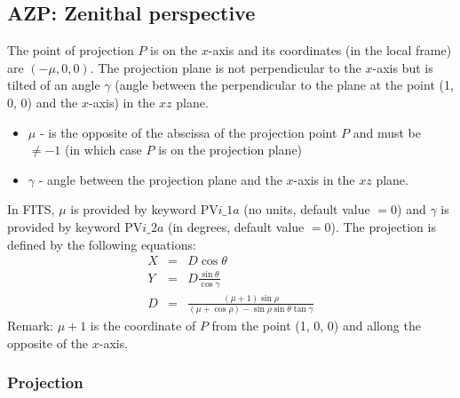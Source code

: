 \subsection{AZP: Zenithal perspective \label{sec:azp}}

  The point of projection $P$ is on the $x$-axis and its coordinates (in the local frame) are $(-\mu, 0, 0)$.
  The projection plane is not perpendicular to the $x$-axis but is tilted of an angle $\gamma$
  (angle between the perpendicular to the plane at the point (1, 0, 0) and the $x$-axis) in the $xz$ plane.
  \begin{itemize}
    \item $\mu$ - is the opposite of the abscissa of the projection point $P$ and must be $\ne -1$
          (in which case $P$ is on the projection plane)
    \item $\gamma$ - angle between the projection plane and the $x$-axis in the $xz$ plane.
  \end{itemize}
  In FITS, $\mu$ is provided by keyword PV$i\_1a$ (no units, default value $=0$) and
  $\gamma$ is provided by keyword PV$i\_2a$ (in degrees, default value $=0$).
  The projection is defined by the following equations:
  \begin{eqnarray}
    X & = & D \cos\theta \\
    Y & = & D \frac{\sin\theta}{\cos\gamma} \\
    D & = & \frac{(\mu + 1) \sin\rho}{(\mu + \cos\rho) - \sin\rho\sin\theta\tan\gamma}
  \end{eqnarray}
  Remark: $\mu + 1$ is the coordinate of $P$ from the point (1, 0, 0) and allong the opposite of the $x$-axis.

\subsubsection{Projection}

